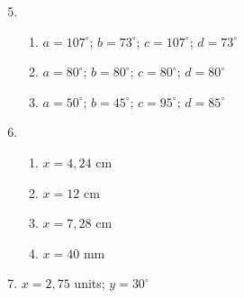 {\begin{multicols}{3}
\begin{enumerate}[noitemsep, label=\textbf{\arabic*}.]
\setcounter{enumi}{4}
      \item %
	  \begin{enumerate}[noitemsep, label=\textbf{(\alph*)} ]
		\item $a=107^{\circ}$; $ b=73^{\circ}$; $c=107^{\circ}$; $d=73^{\circ}$
\item $a=80^{\circ}$; $b=80^{\circ}$; $c=80^{\circ}$; $d=80^{\circ}$
\item $a=50^{\circ}$; $ b=45^{\circ}$; $c=95^{\circ}$; $ d=85^{\circ}$
	  \end{enumerate}

\setcounter{enumi}{6}
      \item %
	  \begin{enumerate}[noitemsep, label=\textbf{(\alph*)} ]
	\item $x=4,24$ cm%

\item $x=12$ cm%

\item $x=7,28$ cm%

\item $x=40$ mm%
	  \end{enumerate}
\setcounter{enumi}{8}
      \item  $x=2,75$ units; $y=30^{\circ}$%


\end{enumerate}
\end{multicols}}
